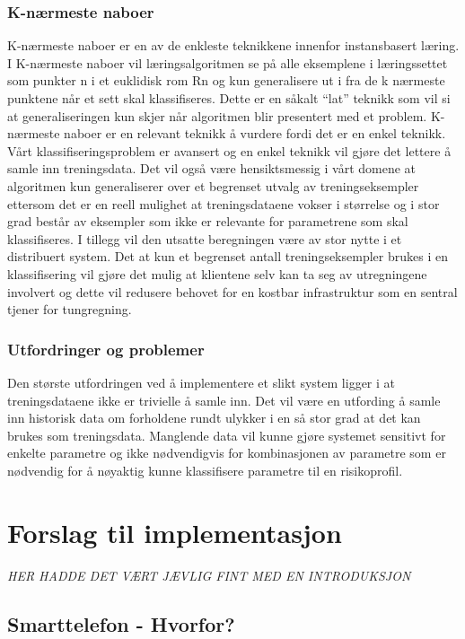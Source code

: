 \documentclass[a4paper,norsk,oneside]{book}
\begin{document}
\subsection{K-nærmeste naboer}
K-nærmeste naboer er en av de enkleste teknikkene innenfor instansbasert læring. I K-nærmeste naboer vil læringsalgoritmen se på alle eksemplene i læringssettet som punkter n i et euklidisk rom Rn og kun generalisere ut i fra de k nærmeste punktene når et sett skal klassifiseres.\cite{mitchell} Dette er en såkalt “lat” teknikk som vil si at generaliseringen kun skjer når algoritmen blir presentert med et problem. K-nærmeste naboer er en relevant teknikk å vurdere fordi det er en enkel teknikk. Vårt klassifiseringsproblem er avansert og en enkel teknikk vil gjøre det lettere å samle inn treningsdata. Det vil også være hensiktsmessig i vårt domene at algoritmen kun generaliserer over et begrenset utvalg av treningseksempler ettersom det er en reell mulighet at treningsdataene vokser i størrelse og i stor grad består av eksempler som ikke er relevante for parametrene som skal klassifiseres. I tillegg vil den utsatte beregningen være av stor nytte i et distribuert system. Det at kun et begrenset antall treningseksempler brukes i en klassifisering vil gjøre det mulig at klientene selv kan ta seg av utregningene involvert og dette vil redusere behovet for en kostbar infrastruktur som en sentral tjener for tungregning.

\subsection{Utfordringer og problemer}
Den største utfordringen ved å implementere et slikt system ligger i at treningsdataene ikke er trivielle å samle inn. Det vil være en utfording å samle inn historisk data om forholdene rundt ulykker i en så stor grad at det kan brukes som treningsdata. Manglende data vil kunne gjøre systemet sensitivt for enkelte parametre og ikke nødvendigvis for kombinasjonen av parametre som er nødvendig for å nøyaktig kunne klassifisere parametre til en risikoprofil.  

\chapter{Forslag til implementasjon}
\label{cha:implementasjon}

{\it HER HADDE DET VÆRT JÆVLIG FINT MED EN INTRODUKSJON }

\section{Smarttelefon - Hvorfor?}
\label{sec:smarttelefon}
\end{document}
